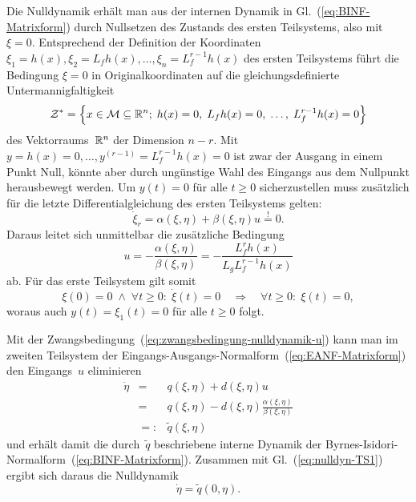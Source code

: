 Die Nulldynamik erhält man aus der internen Dynamik in Gl.~(\ref{eq:BINF-Matrixform})
durch Nullsetzen des Zustands des ersten Teilsystems, also mit $\xi=0$.
Entsprechend der Definition der Koordinaten $\xi_{1}=h(x),\xi_{2}=L_{f}h(x),\ldots,\xi_{n}=L_{f}^{r-1}h(x)$
des ersten Teilsystems führt die Bedingung $\xi=0$ in Originalkoordinaten
auf die gleichungsdefinierte Untermannigfaltigkeit 
\begin{equation}
\mathcal{Z}^{*}=\left\{ x\in\mathcal{M}\subseteq{\mathbb{R}}^{n};\;h(x)=0,\;L_{f}h(x)=0,\;\ldots,\;L_{f}^{r-1}h(x)=0\right\} \label{eq:zwangsbedingung-nulldynamik-x}
\end{equation}
des Vektorraums~${\mathbb{R}}^{n}$ der Dimension $n-r$. Mit $y=h(x)=0,\ldots,y^{(r-1)}=L_{f}^{r-1}h(x)=0$
ist zwar der Ausgang in einem Punkt Null, könnte aber durch ungünstige
Wahl des Eingangs aus dem Nullpunkt herausbewegt werden. Um $y(t)=0$
für alle $t\geq0$ sicherzustellen muss zusätzlich für die letzte
Differentialgleichung des ersten Teilsystems gelten: 
\[
\dot{\xi}_{r}=\alpha(\xi,\eta)+\beta(\xi,\eta)u\stackrel{!}{=}0.
\]
Daraus leitet sich unmittelbar die zusätzliche Bedingung 
\begin{equation}
u=-\frac{\alpha(\xi,\eta)}{\beta(\xi,\eta)}=-\frac{L_{f}^{r}h(x)}{L_{g}L_{f}^{r-1}h(x)}\label{eq:zwangsbedingung-nulldynamik-u}
\end{equation}
ab. Für das erste Teilsystem gilt somit 
\begin{equation}
\xi(0)=0\;\wedge\;\forall t\geq0:\;\dot{\xi}(t)=0\quad\Longrightarrow\quad\forall t\geq0:\;\xi(t)=0,\label{eq:nulldyn-TS1}
\end{equation}
woraus auch $y(t)=\xi_{1}(t)=0$ für alle $t\geq0$ folgt.

Mit der Zwangsbedingung~(\ref{eq:zwangsbedingung-nulldynamik-u})
kann man im zweiten Teilsystem der Eingangs-Ausgangs-Normalform~(\ref{eq:EANF-Matrixform})
den Eingangs~$u$ eliminieren
\[
\begin{array}{cll}
\dot{\eta} & = & q(\xi,\eta)+d(\xi,\eta)u\\
 & = & q(\xi,\eta)-d(\xi,\eta)\frac{\alpha(\xi,\eta)}{\beta(\xi,\eta)}\\
 & =: & \tilde{q}(\xi,\eta)
\end{array}
\]
und erhält damit die durch~$\tilde{q}$ beschriebene interne Dynamik
der Byrnes-Isidori-Normalform~(\ref{eq:BINF-Matrixform}). Zusammen
mit Gl.~(\ref{eq:nulldyn-TS1}) ergibt sich daraus die Nulldynamik
\begin{equation}
\dot{\eta}=\tilde{q}(0,\eta).\label{eq:nulldyn-TS2}
\end{equation}

